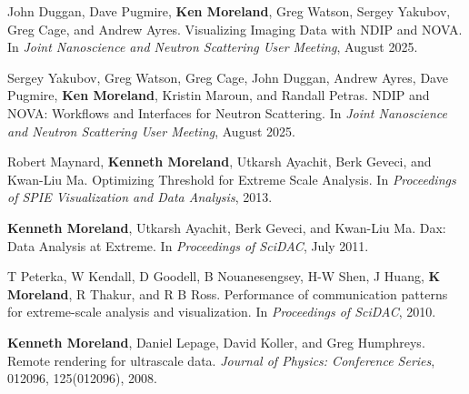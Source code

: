 \begin{enumerate}[label={[\arabic*]}, left=0pt]
\item  %
  John Duggan, Dave Pugmire, \textbf{Ken Moreland}, Greg Watson, Sergey Yakubov, Greg Cage, and Andrew Ayres.
  Visualizing Imaging Data with {NDIP} and {NOVA}.
  In \emph{Joint Nanoscience and Neutron Scattering User Meeting}, August 2025.
\item  %
  Sergey Yakubov, Greg Watson, Greg Cage, John Duggan, Andrew Ayres, Dave Pugmire, \textbf{Ken Moreland}, Kristin Maroun, and Randall Petras.
  {NDIP} and {NOVA}: Workflows and Interfaces for Neutron Scattering.
  In \emph{Joint Nanoscience and Neutron Scattering User Meeting}, August 2025.
\item  %
  Robert Maynard, \textbf{Kenneth Moreland}, Utkarsh Ayachit, Berk Geveci, and Kwan-Liu Ma.
  Optimizing Threshold for Extreme Scale Analysis.
  In \emph{Proceedings of SPIE Visualization and Data Analysis}, 2013.
\item  %
  \textbf{Kenneth Moreland}, Utkarsh Ayachit, Berk Geveci, and Kwan-Liu Ma.
  Dax: Data Analysis at Extreme.
  In \emph{Proceedings of SciDAC}, July 2011.
\item  %
  T Peterka, W Kendall, D Goodell, B Nouanesengsey, H-W Shen, J Huang, \textbf{K Moreland}, R Thakur, and R B Ross.
  Performance of communication patterns for extreme-scale analysis and visualization.
  In \emph{Proceedings of SciDAC}, 2010.
\item  %
  \textbf{Kenneth Moreland}, Daniel Lepage, David Koller, and Greg Humphreys.
  Remote rendering for ultrascale data.
  \emph{Journal of Physics: Conference Series}, 012096, 125(012096), 2008.
\end{enumerate}